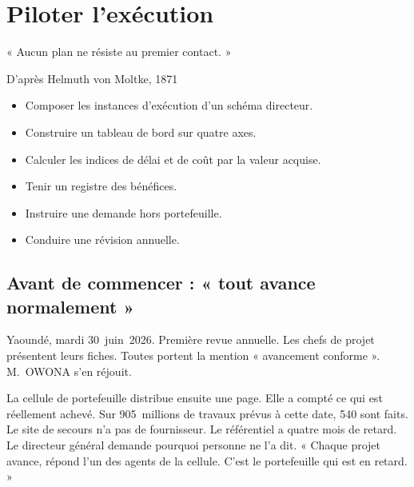 
\chapter{Piloter l'exécution}
\label{chap:piloter}

\epigraph{%
    « Aucun plan ne résiste au premier contact. »%
}{D'après Helmuth von Moltke, 1871}


\begin{boxobjectifs}
\begin{itemize}
    \item Composer les instances d'exécution d'un schéma directeur.
    \item Construire un tableau de bord sur quatre axes.
    \item Calculer les indices de délai et de coût par la valeur acquise.
    \item Tenir un registre des bénéfices.
    \item Instruire une demande hors portefeuille.
    \item Conduire une révision annuelle.
\end{itemize}
\end{boxobjectifs}

\bigskip

\section*{Avant de commencer : « tout avance normalement »}

Yaoundé, mardi 30~juin~2026. Première revue annuelle. Les chefs de projet présentent leurs fiches. Toutes
portent la mention « avancement conforme ». M.~OWONA s'en réjouit.

La cellule de portefeuille distribue ensuite une page. Elle a compté ce qui est réellement achevé. Sur
905~millions de travaux prévus à cette date, 540 sont faits. Le site de secours n'a pas de fournisseur. Le
référentiel a quatre mois de retard. Le directeur général demande pourquoi personne ne l'a dit. « Chaque projet
avance, répond l'un des agents de la cellule. C'est le portefeuille qui est en retard. »

